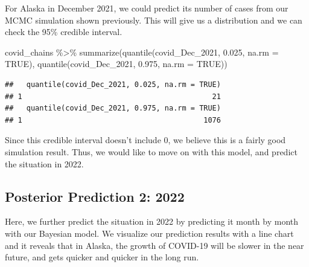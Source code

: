 \documentclass[
]{book}
\newenvironment{Shaded}{\begin{snugshade}}{\end{snugshade}}
\newcommand{\AttributeTok}[1]{\textcolor[rgb]{0.77,0.63,0.00}{#1}}
\newcommand{\ConstantTok}[1]{\textcolor[rgb]{0.00,0.00,0.00}{#1}}
\newcommand{\FloatTok}[1]{\textcolor[rgb]{0.00,0.00,0.81}{#1}}
\newcommand{\FunctionTok}[1]{\textcolor[rgb]{0.00,0.00,0.00}{#1}}
\newcommand{\NormalTok}[1]{#1}
\newcommand{\SpecialCharTok}[1]{\textcolor[rgb]{0.00,0.00,0.00}{#1}}
\begin{document}
For Alaska in December 2021, we could predict its number of cases from our MCMC simulation shown previously. This will give us a distribution and we can check the 95\% credible interval.

\begin{Shaded}
\begin{Highlighting}[]
\NormalTok{covid\_chains }\SpecialCharTok{\%\textgreater{}\%}
  \FunctionTok{summarize}\NormalTok{(}\FunctionTok{quantile}\NormalTok{(covid\_Dec\_2021, }\FloatTok{0.025}\NormalTok{, }\AttributeTok{na.rm =} \ConstantTok{TRUE}\NormalTok{), }\FunctionTok{quantile}\NormalTok{(covid\_Dec\_2021, }\FloatTok{0.975}\NormalTok{, }\AttributeTok{na.rm =} \ConstantTok{TRUE}\NormalTok{))}
\end{Highlighting}
\end{Shaded}

\begin{verbatim}
##   quantile(covid_Dec_2021, 0.025, na.rm = TRUE)
## 1                                            21
##   quantile(covid_Dec_2021, 0.975, na.rm = TRUE)
## 1                                          1076
\end{verbatim}

Since this credible interval doesn't include 0, we believe this is a fairly good simulation result. Thus, we would like to move on with this model, and predict the situation in 2022.

\hypertarget{posterior-prediction-2-2022}{%
\subsection{Posterior Prediction 2: 2022}\label{posterior-prediction-2-2022}}

Here, we further predict the situation in 2022 by predicting it month by month with our Bayesian model. We visualize our prediction results with a line chart and it reveals that in Alaska, the growth of COVID-19 will be slower in the near future, and gets quicker and quicker in the long run.
\end{document}
